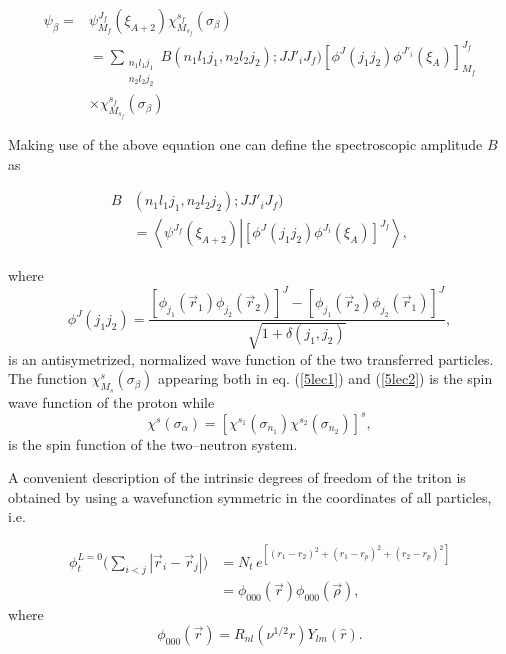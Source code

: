 \begin{subappendices}
\begin{equation}\label{5lec2}
\begin{split}
\psi_\beta=& \psi_{M_f}^{J_f}(\xi_{A+2}) \chi^{s_f}_{M_{s_f}}(\sigma_\beta)\\
&=\sum_{\substack{n_1 l_1 j_1\\n_2 l_2 j_2}} B(n_1 l_1 j_1,n_2 l_2 j_2);JJ'_iJ_f)
\left[ \phi^J(j_1 j_2) \phi^{J'_i}(\xi_A)\right]^{J_f}_{M_f}\\
&\times \chi^{s_f}_{M_{s_f}}(\sigma_\beta)
\end{split}
\end{equation}

Making use of the above equation one can define the spectroscopic amplitude $B$ as

\begin{equation}\label{5lec3}
\begin{split}
B&(n_1 l_1 j_1,n_2 l_2 j_2);JJ'_iJ_f)\\
&=\left\langle  \psi^{J_f}(\xi_{A+2})\left |\left[ \phi^J(j_1 j_2) \phi^{J_i}(\xi_A)\right]^{J_f}\right. \right\rangle,
\end{split}
\end{equation}

where
\begin{equation}\label{5lec4}
\phi^J(j_1 j_2)=\frac{\left[ \phi_{j_1}(\vec r_1) \phi_{j_2}(\vec r_2)\right]^{J}-
\left[ \phi_{j_1}(\vec r_2) \phi_{j_2}(\vec r_1)\right]^{J}}{\sqrt{1+\delta(j_1,j_2)}},
\end{equation}
is an antisymetrized, normalized wave function of the two transferred particles. The function $\chi^{s}_{M_{s}}(\sigma_\beta)$ appearing  both in eq. (\ref{5lec1}) and (\ref{5lec2}) is the spin wave function of the proton while 
\begin{equation}\label{5lec5}
\chi^{s}(\sigma_\alpha)=\left[ \chi^{s_1}(\sigma_{n_1}) \chi^{s_2}(\sigma_{n_2})\right]^{s},
\end{equation}
is the spin function of the two--neutron system.


A convenient description of the intrinsic  degrees of freedom of the triton is obtained by using a wavefunction symmetric in the coordinates of all particles, i.e.

\begin{equation}\label{5lec6}
\begin{split}
\phi_t^{L=0}\bigl(\sum_{i<j}|\vec r_i-\vec r_j|\bigr)&=N_t\,e^{[(r_1-r_2)^2+(r_1-r_p)^2+(r_2-r_p)^2]}\\
&=\phi_{000}(\vec r)\phi_{000}(\vec \rho),
\end{split}
\end{equation}
where
\begin{equation}
\phi_{000}(\vec r)=R_{nl}(\nu^{1/2 }r) Y_{lm}(\hat r).
\end{equation}


\end{subappendices}
